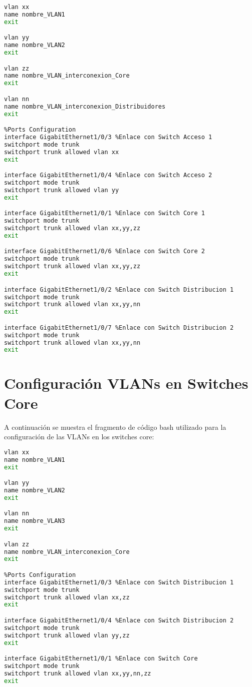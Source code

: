 \begin{lstlisting}[language=Bash, caption={Configuración VLANs en Switches de Distribución}]
%Create VLANs
vlan xx 
name nombre_VLAN1
exit 

vlan yy 
name nombre_VLAN2
exit 

vlan zz 
name nombre_VLAN_interconexion_Core
exit 

vlan nn 
name nombre_VLAN_interconexion_Distribuidores
exit 

%Ports Configuration
interface GigabitEthernet1/0/3 %Enlace con Switch Acceso 1
switchport mode trunk 
switchport trunk allowed vlan xx 
exit 

interface GigabitEthernet1/0/4 %Enlace con Switch Acceso 2
switchport mode trunk 
switchport trunk allowed vlan yy 
exit 

interface GigabitEthernet1/0/1 %Enlace con Switch Core 1
switchport mode trunk 
switchport trunk allowed vlan xx,yy,zz
exit 

interface GigabitEthernet1/0/6 %Enlace con Switch Core 2
switchport mode trunk 
switchport trunk allowed vlan xx,yy,zz
exit 

interface GigabitEthernet1/0/2 %Enlace con Switch Distribucion 1
switchport mode trunk 
switchport trunk allowed vlan xx,yy,nn
exit 

interface GigabitEthernet1/0/7 %Enlace con Switch Distribucion 2
switchport mode trunk 
switchport trunk allowed vlan xx,yy,nn
exit 
\end{lstlisting}

\section{Configuración VLANs en Switches Core}\label{anexo:VLANSwCo}
A continuación se muestra el fragmento de código bash utilizado para la configuración de las VLANs en los switches core:

\begin{lstlisting}[language=Bash, caption={Configuración VLANs en Switches Core}]
%Create VLANs
vlan xx 
name nombre_VLAN1
exit 

vlan yy 
name nombre_VLAN2
exit 

vlan nn
name nombre_VLAN3
exit 

vlan zz 
name nombre_VLAN_interconexion_Core
exit 

%Ports Configuration
interface GigabitEthernet1/0/3 %Enlace con Switch Distribucion 1
switchport mode trunk 
switchport trunk allowed vlan xx,zz 
exit 

interface GigabitEthernet1/0/4 %Enlace con Switch Distribucion 2
switchport mode trunk 
switchport trunk allowed vlan yy,zz
exit 

interface GigabitEthernet1/0/1 %Enlace con Switch Core
switchport mode trunk 
switchport trunk allowed vlan xx,yy,nn,zz
exit 
\end{lstlisting}

